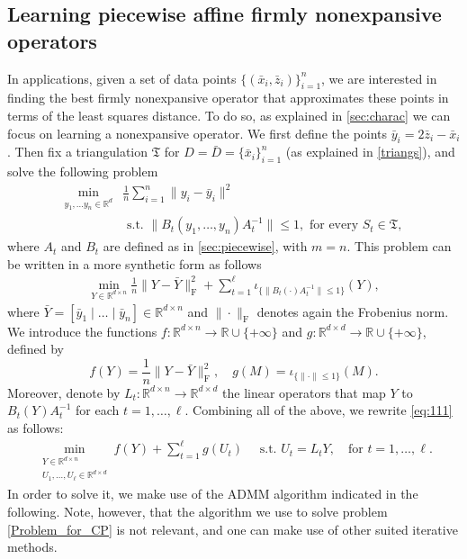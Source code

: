 \documentclass[onefignum,onetabnum]{siamonline250211}
\begin{document}
\subsection{Learning piecewise affine firmly nonexpansive operators}\label{sec:learningPA} 
In applications, given a set of data points $\{(\bar x_i,\bar z_i)\}_{i=1}^n$, we are interested in finding the best firmly nonexpansive operator that approximates these points in terms of the least squares distance. To do so, as explained in \cref{sec:charac} we can focus on learning a nonexpansive operator. We first define the points $\bar y_i=2\bar z_i-\bar x_i$. Then fix a triangulation $\mathfrak{T}$ for $D=\bar D =\{\bar x_i\}_{i=1}^n$ (as explained in \cref{triangs}), and solve the following problem
\begin{equation}\label{eq:learning_task}
\begin{aligned}
    \min_{y_1,\dots y_n\in\mathbb{R}^d} & \frac{1}{n}\sum_{i=1}^n\|y_i-\bar{y}_i\|^2\\ 
    & \text{ s.t. } \|B_t(y_1,\dots,y_n)A_t^{-1}\|\leq 1, \text{ for every } S_t\in \mathfrak{T},
\end{aligned}
\end{equation}
where $A_t$ and $B_t$ are defined as in \cref{sec:piecewise}, with $m=n$. This problem can be written in a more synthetic form as follows
\begin{equation}\label{eq:111}
\begin{aligned}
    \min_{Y\in \mathbb{R}^{d\times n}} \frac{1}{n}\|Y-\bar{Y}\|_{\mathrm{F}}^2 + \sum_{t=1}^{\ell}\iota_{\{\|B_t(\cdot)A_t^{-1}\|\leq 1\}}(Y),
\end{aligned}
\end{equation}
where $\bar Y = [\bar y_1 \mid \dots \mid \bar y_n] \in \mathbb{R}^{d \times n}$ and $\|\cdot\|_{\mathrm{F}}$ denotes again the Frobenius norm. We introduce the functions $f:\mathbb{R}^{d\times n}\to  \mathbb{R}\cup \{+\infty\}$ and $g:\mathbb{R}^{d\times d}\to  \mathbb{R}\cup \{+\infty\}$, defined by
$$
f(Y)=\frac{1}{n}\|Y-\bar Y\|_{\mathrm{F}}^2, \quad g(M)=\iota_{\{\|\cdot\|\leq 1\}}(M).
$$
Moreover, denote by $L_t:\mathbb{R}^{d\times n}\to\mathbb{R}^{d\times d}$ the linear operators that map $Y$ to $B_t(Y)A_t^{-1}$ for each $t=1,\dots, \ell$. Combining all of the above, we rewrite \cref{eq:111}
as follows:
\begin{equation}\label{Problem_for_CP}
\begin{aligned}
    \min_{\substack{Y\in \mathbb{R}^{d\times n}\\ U_1,\ldots, U_\ell\in \mathbb{R}^{d\times d} }} f(Y) + \sum_{t=1}^{\ell}g(U_t) \quad \text{ s.t. } U_t=L_t Y, \quad \text{for } t=1,\dots, \ell.
\end{aligned}
\end{equation}
In order to solve it, we make use of the ADMM algorithm \cite{admm} indicated in the following. Note, however, that the algorithm we use to solve problem \cref{Problem_for_CP} is not relevant, and one can make use of other suited iterative methods.
\end{document}
